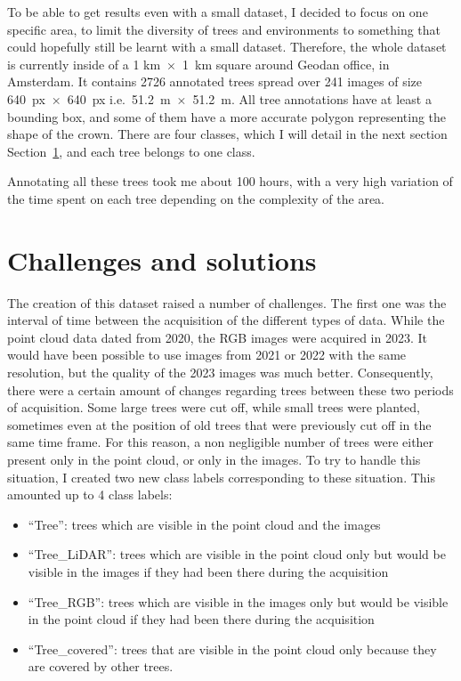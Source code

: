 \documentclass[
]{report}
\providecommand{\tightlist}{%
  \setlength{\itemsep}{0pt}\setlength{\parskip}{0pt}}\usepackage{longtable,booktabs,array}
\begin{document}
To be able to get results even with a small dataset, I decided to focus
on one specific area, to limit the diversity of trees and environments
to something that could hopefully still be learnt with a small dataset.
Therefore, the whole dataset is currently inside of a 1 km~×~1~km square
around Geodan office, in Amsterdam. It contains 2726 annotated trees
spread over 241 images of size 640~px~×~640~px i.e.~51.2~m~×~51.2~m. All
tree annotations have at least a bounding box, and some of them have a
more accurate polygon representing the shape of the crown. There are
four classes, which I will detail in the next section
Section~\ref{sec-dataset-challenges}, and each tree belongs to one
class.

Annotating all these trees took me about 100 hours, with a very high
variation of the time spent on each tree depending on the complexity of
the area.

\section{Challenges and solutions}\label{sec-dataset-challenges}

The creation of this dataset raised a number of challenges. The first
one was the interval of time between the acquisition of the different
types of data. While the point cloud data dated from 2020, the RGB
images were acquired in 2023. It would have been possible to use images
from 2021 or 2022 with the same resolution, but the quality of the 2023
images was much better. Consequently, there were a certain amount of
changes regarding trees between these two periods of acquisition. Some
large trees were cut off, while small trees were planted, sometimes even
at the position of old trees that were previously cut off in the same
time frame. For this reason, a non negligible number of trees were
either present only in the point cloud, or only in the images. To try to
handle this situation, I created two new class labels corresponding to
these situation. This amounted up to 4 class labels:

\begin{itemize}
\tightlist
\item
  ``Tree'': trees which are visible in the point cloud and the images
\item
  ``Tree\_LiDAR'': trees which are visible in the point cloud only but
  would be visible in the images if they had been there during the
  acquisition
\item
  ``Tree\_RGB'': trees which are visible in the images only but would be
  visible in the point cloud if they had been there during the
  acquisition
\item
  ``Tree\_covered'': trees that are visible in the point cloud only
  because they are covered by other trees.
\end{itemize}
\end{document}
